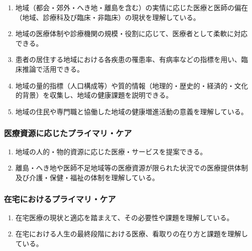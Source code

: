\begin{enumerate}
\def\labelenumi{\arabic{enumi}.}
\tightlist
\item
  地域（都会・郊外・へき地・離島を含む）の実情に応じた医療と医師の偏在（地域、診療科及び臨床・非臨床）の現状を理解している。
\item
  地域の医療体制や診療機関の規模・役割に応じて、医療者として柔軟に対応できる。
\item
  患者の居住する地域における各疾患の罹患率、有病率などの指標を用い、臨床推論で活用できる。
\item
  地域の量的指標（人口構成等）や質的情報（地理的・歴史的・経済的・文化的背景）を収集し、地域の健康課題を説明できる。
\item
  地域の住民や専門職と協働した地域の健康増進活動の意義を理解している。
\end{enumerate}

\hypertarget{ux533bux7642ux8cc7ux6e90ux306bux5fdcux3058ux305fux30d7ux30e9ux30a4ux30deux30eaux30b1ux30a2}{%
\subsubsection{医療資源に応じたプライマリ・ケア}\label{ux533bux7642ux8cc7ux6e90ux306bux5fdcux3058ux305fux30d7ux30e9ux30a4ux30deux30eaux30b1ux30a2}}

\begin{enumerate}
\def\labelenumi{\arabic{enumi}.}
\tightlist
\item
  地域の人的・物的資源に応じた医療・サービスを提案できる。
\item
  離島・へき地や医師不足地域等の医療資源が限られた状況での医療提供体制及び介護・保健・福祉の体制を理解している。
\end{enumerate}

\hypertarget{ux5728ux5b85ux306bux304aux3051ux308bux30d7ux30e9ux30a4ux30deux30eaux30b1ux30a2}{%
\subsubsection{在宅におけるプライマリ・ケア}\label{ux5728ux5b85ux306bux304aux3051ux308bux30d7ux30e9ux30a4ux30deux30eaux30b1ux30a2}}

\begin{enumerate}
\def\labelenumi{\arabic{enumi}.}
\tightlist
\item
  在宅医療の現状と適応を踏まえて、その必要性や課題を理解している。
\item
  在宅における人生の最終段階における医療、看取りの在り方と課題を理解している。
\end{enumerate}

